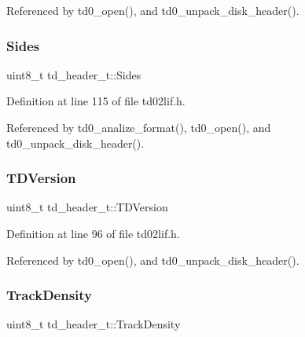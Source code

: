 Referenced by td0\+\_\+open(), and td0\+\_\+unpack\+\_\+disk\+\_\+header().

\mbox{\label{structtd__header__t_a8b188d880b5d9d94122674265b0ca3e6}} 
\subsubsection{\texorpdfstring{Sides}{Sides}}
{\footnotesize\ttfamily uint8\+\_\+t td\+\_\+header\+\_\+t\+::\+Sides}



Definition at line 115 of file td02lif.\+h.



Referenced by td0\+\_\+analize\+\_\+format(), td0\+\_\+open(), and td0\+\_\+unpack\+\_\+disk\+\_\+header().

\mbox{\label{structtd__header__t_ac63e3625279d7262e3d094c0c5e5753a}} 
\subsubsection{\texorpdfstring{T\+D\+Version}{TDVersion}}
{\footnotesize\ttfamily uint8\+\_\+t td\+\_\+header\+\_\+t\+::\+T\+D\+Version}



Definition at line 96 of file td02lif.\+h.



Referenced by td0\+\_\+open(), and td0\+\_\+unpack\+\_\+disk\+\_\+header().

\mbox{\label{structtd__header__t_a2d1461bb956665d519d33fca629477ab}} 
\subsubsection{\texorpdfstring{Track\+Density}{TrackDensity}}
{\footnotesize\ttfamily uint8\+\_\+t td\+\_\+header\+\_\+t\+::\+Track\+Density}




